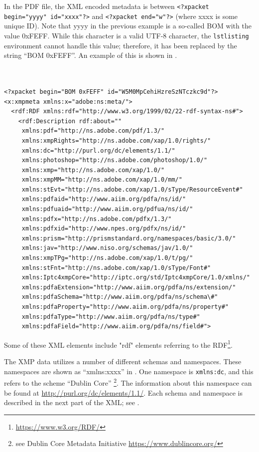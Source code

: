 \documentclass[12pt, twoside]{article}
\begin{document}
In the \gls{PDF} file, the \gls{XML} encoded metadata is between \texttt{<?xpacket begin="yyyy" id="xxxx"?>} and \texttt{<?xpacket end="w"?>} (where xxxx is some unique ID). Note that yyyy in the previous example is a so-called \gls{BOM} with the value 0xFEFF. While this character is a valid \mbox{UTF-8} character, the \texttt{lstlisting} environment cannot handle this value; therefore, it has been replaced by the string \enquote{BOM 0xFEFF}. An example of this is shown in .
\clearpage
\begin{lstlisting}[style={myXML}, caption={The first part of the XML metadata embedded in a PDF file (some reformatting has been done to fit the text in the borders)}, label={lst:pdfinfoOutput}]


<?xpacket begin="BOM 0xFEFF" id="W5M0MpCehiHzreSzNTczkc9d"?>
<x:xmpmeta xmlns:x="adobe:ns:meta/">
  <rdf:RDF xmlns:rdf="http://www.w3.org/1999/02/22-rdf-syntax-ns#">
    <rdf:Description rdf:about=""
     xmlns:pdf="http://ns.adobe.com/pdf/1.3/"
     xmlns:xmpRights="http://ns.adobe.com/xap/1.0/rights/"
     xmlns:dc="http://purl.org/dc/elements/1.1/"
     xmlns:photoshop="http://ns.adobe.com/photoshop/1.0/"
     xmlns:xmp="http://ns.adobe.com/xap/1.0/"
     xmlns:xmpMM="http://ns.adobe.com/xap/1.0/mm/"
     xmlns:stEvt="http://ns.adobe.com/xap/1.0/sType/ResourceEvent#"
     xmlns:pdfaid="http://www.aiim.org/pdfa/ns/id/"
     xmlns:pdfuaid="http://www.aiim.org/pdfua/ns/id/"
     xmlns:pdfx="http://ns.adobe.com/pdfx/1.3/"
     xmlns:pdfxid="http://www.npes.org/pdfx/ns/id/"
     xmlns:prism="http://prismstandard.org/namespaces/basic/3.0/"
     xmlns:jav="http://www.niso.org/schemas/jav/1.0/"
     xmlns:xmpTPg="http://ns.adobe.com/xap/1.0/t/pg/"
     xmlns:stFnt="http://ns.adobe.com/xap/1.0/sType/Font#"
     xmlns:Iptc4xmpCore="http://iptc.org/std/Iptc4xmpCore/1.0/xmlns/"
     xmlns:pdfaExtension="http://www.aiim.org/pdfa/ns/extension/"
     xmlns:pdfaSchema="http://www.aiim.org/pdfa/ns/schema\#"
     xmlns:pdfaProperty="http://www.aiim.org/pdfa/ns/property#"
     xmlns:pdfaType="http://www.aiim.org/pdfa/ns/type#"
     xmlns:pdfaField="http://www.aiim.org/pdfa/ns/field#">
\end{lstlisting}

Some of these XML elements include "rdf" elements referring to the \gls{RDF}\footnote{\url{https://www.w3.org/RDF/}}.

The \gls{XMP} data utilizes a number of different schemas and namespaces. These namespaces are shown as \enquote{xmlns:xxxx}  in . One namespace is \texttt{xmlns:dc}, and this refers to the scheme \enquote{Dublin Core} \footnote{see Dublin Core Metadata Initiative \url{https://www.dublincore.org/}}. The information about this namespace can be found at \url{http://purl.org/dc/elements/1.1/}. Each schema and namespace is described in the next part of the \gls{XML}; see .
\end{document}
